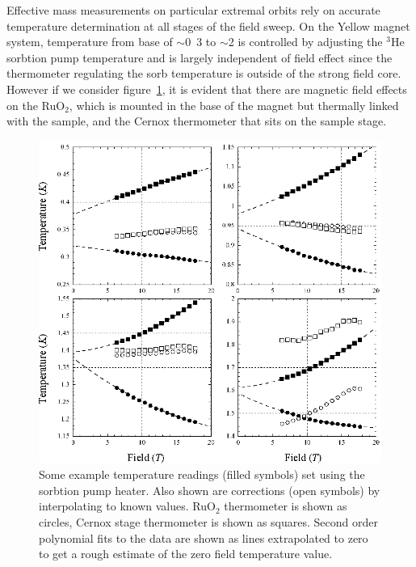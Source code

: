 Effective mass measurements on particular extremal orbits rely on accurate temperature determination at all stages of the field sweep. On the Yellow magnet system, temperature from base of $\sim$\unit{0.3}{\kelvin} to $\sim$\unit{2}{\kelvin} is controlled by adjusting the $^3$He sorbtion pump temperature and is largely independent of field effect since the thermometer regulating the sorb temperature is outside of the strong field core. However if we consider figure~\ref{Fig:Exp:TemperatureCorrection}, it is evident that there are magnetic field effects on the RuO$_2$, which is mounted in the base of the magnet but thermally linked with the sample, and the Cernox thermometer that sits on the sample stage.
\begin{figure}[htbp]
    \begin{center}
        \includegraphics[scale=0.9]{Chapter-ExperimentalTechnique/Figures/TemperatureCorrection/TemperatureCorrection}
        \caption{Some example temperature readings (filled symbols) set using the sorbtion pump heater. Also shown are corrections (open symbols) by interpolating to known values. RuO$_2$ thermometer is shown as circles, Cernox stage thermometer is shown as squares. Second order polynomial fits to the data are shown as lines extrapolated to zero to get a rough estimate of the zero field temperature value.}
        \label{Fig:Exp:TemperatureCorrection}
    \end{center}
\end{figure}
